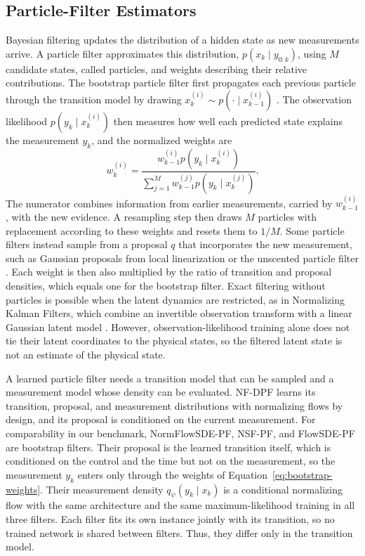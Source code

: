 \subsection{Particle-Filter Estimators}\label{sec:related-pf}
Bayesian filtering updates the distribution of a hidden state as new measurements arrive. A particle filter approximates this distribution, $p(x_k\mid y_{0:k})$, using $M$ candidate states, called particles, and weights describing their relative contributions. The bootstrap particle filter first propagates each previous particle through the transition model by drawing $x_k^{(i)}\sim p(\cdot\mid x_{k-1}^{(i)})$ \citep{gordon1993bootstrap}. The observation likelihood $p(y_k\mid x_k^{(i)})$ then measures how well each predicted state explains the measurement $y_k$, and the normalized weights are
\begin{equation}\label{eq:bootstrap-weights}
 w_k^{(i)}=
 \frac{w_{k-1}^{(i)}p(y_k\mid x_k^{(i)})}
 {\sum_{j=1}^{M}w_{k-1}^{(j)}p(y_k\mid x_k^{(j)})}.
\end{equation}
The numerator combines information from earlier measurements, carried by $w_{k-1}^{(i)}$, with the new evidence. A resampling step then draws $M$ particles with replacement according to these weights and resets them to $1/M$. Some particle filters instead sample from a proposal $q$ that incorporates the new measurement, such as Gaussian proposals from local linearization \citep{doucet2000sequential} or the unscented particle filter \citep{vandermerwe2000unscented}. Each weight is then also multiplied by the ratio of transition and proposal densities, which equals one for the bootstrap filter. Exact filtering without particles is possible when the latent dynamics are restricted, as in Normalizing Kalman Filters, which combine an invertible observation transform with a linear Gaussian latent model \citep{debezenac2020nkf}. However, observation-likelihood training alone does not tie their latent coordinates to the physical states, so the filtered latent state is not an estimate of the physical state.

A learned particle filter needs a transition model that can be sampled and a measurement model whose density can be evaluated. NF-DPF learns its transition, proposal, and measurement distributions with normalizing flows by design, and its proposal is conditioned on the current measurement. For comparability in our benchmark, NormFlowSDE-PF, NSF-PF, and FlowSDE-PF are bootstrap filters. Their proposal is the learned transition itself, which is conditioned on the control and the time but not on the measurement, so the measurement $y_k$ enters only through the weights of Equation~\eqref{eq:bootstrap-weights}. Their measurement density $q_\psi(y_k\mid x_k)$ is a conditional normalizing flow with the same architecture and the same maximum-likelihood training in all three filters. Each filter fits its own instance jointly with its transition, so no trained network is shared between filters. Thus, they differ only in the transition model.

